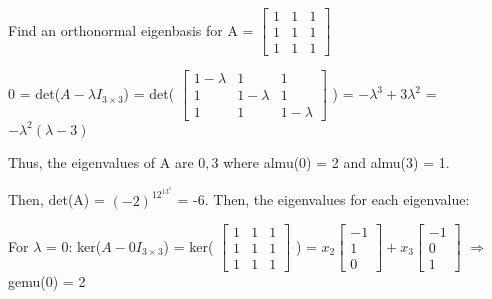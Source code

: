     \newpage



    \begin{example}
        Find an orthonormal eigenbasis for A =
        $\begin{bmatrix}
            1 & 1 & 1 \\
            1 & 1 & 1 \\
            1 & 1 & 1
        \end{bmatrix}$
    \end{example}

    \begin{tbox}
        0 = det($A - \lambda I_{3 \times 3}$) =
        det(
        \scriptsize
        $\begin{bmatrix}
            1-\lambda & 1 & 1 \\
            1 & 1-\lambda & 1 \\
            1 & 1 & 1-\lambda
        \end{bmatrix}$
        \normalsize)
        = $-\lambda^3 + 3\lambda^2$
        = $-\lambda^2(\lambda-3)$

        Thus, the eigenvalues of A are $0,3$ where
        almu(0) = 2 and almu(3) = 1.

        Then, det(A) = $(-2)^12^13^1$ = -6.
        Then, the eigenvalues for each eigenvalue:

        \hspace{0.5cm}
        For $\lambda$ = 0:
        \hspace{0.5cm}
        ker($A - 0I_{3 \times 3}$) =
        ker(
        \scriptsize
        $\begin{bmatrix}
            1 & 1 & 1 \\
            1 & 1 & 1 \\
            1 & 1 & 1
        \end{bmatrix}$
        \normalsize) =
        \scriptsize
        $x_2\begin{bmatrix}
            -1 \\
            1 \\
            0
        \end{bmatrix} +
        x_3\begin{bmatrix}
            -1 \\
            0 \\
            1
        \end{bmatrix}$
        \normalsize
        \hspace{0.1cm}
        $\Rightarrow$
        \hspace{0.5cm}
        gemu(0) = 2


\end{tbox}
